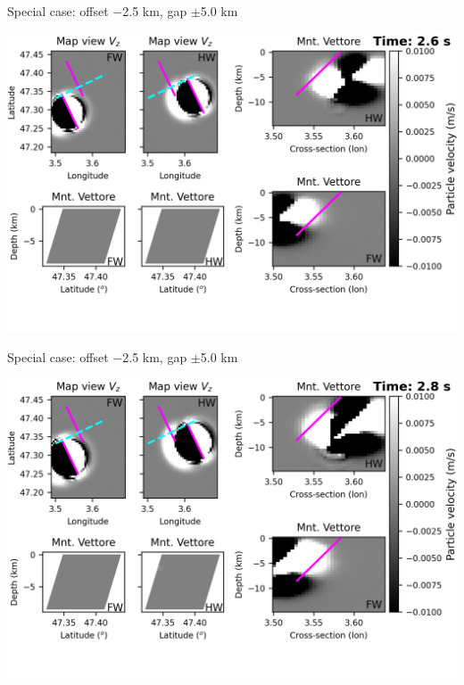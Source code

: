 \documentclass{beamer}
\begin{document}
\begin{frame}
 {Special case: offset $-$2.5 km, gap $\pm$5.0 km}

\begin{center}
    \includegraphics[width=1\linewidth]{images/video_waves/horizontal_delta_00013}
\end{center}
\addtocounter{framenumber}{-1}

\end{frame}


\begin{frame}
 {Special case: offset $-$2.5 km, gap $\pm$5.0 km}

\begin{center}
    \includegraphics[width=1\linewidth]{images/video_waves/horizontal_delta_00014}
\end{center}
\addtocounter{framenumber}{-1}

\end{frame}
\end{document}
